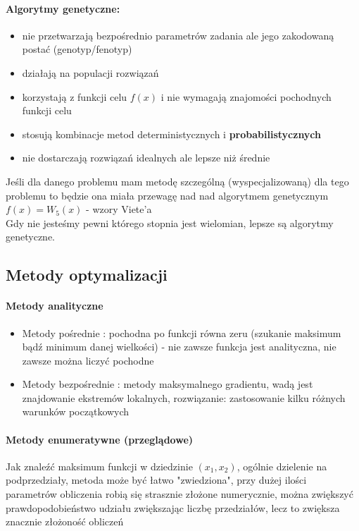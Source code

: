 \documentclass{article}
\begin{document}
		\paragraph{Algorytmy genetyczne:}
		\begin{itemize}
			\item nie przetwarzają bezpośrednio parametrów zadania ale jego zakodowaną postać (genotyp/fenotyp)
			\item działają na populacji rozwiązań
			\item korzystają z funkcji celu $f(x)$ i nie wymagają znajomości pochodnych funkcji celu
			\item stosują kombinacje metod deterministycznych i \textbf{probabilistycznych}
			\item nie dostarczają rozwiązań idealnych ale lepsze niż średnie
			
		\end{itemize}
		Jeśli dla danego problemu mam metodę szczególną (wyspecjalizowaną) dla tego problemu to będzie ona miała przewagę nad nad algorytmem genetycznym\\
		$f(x) = W_5(x)$ - wzory Viete'a\\
		Gdy nie jesteśmy pewni którego stopnia jest wielomian, lepsze są algorytmy genetyczne.
		\subsection{Metody optymalizacji}
			\paragraph{Metody analityczne}
			\begin{itemize}
				\item Metody pośrednie : pochodna po funkcji równa zeru (szukanie maksimum bądź minimum danej wielkości) - nie zawsze funkcja jest analityczna, nie zawsze można liczyć pochodne
				\item Metody bezpośrednie : metody maksymalnego gradientu, wadą jest znajdowanie ekstremów lokalnych, rozwiązanie: zastosowanie kilku różnych warunków początkowych
			\end{itemize}
			\paragraph{Metody enumeratywne (przeglądowe)} Jak znaleźć maksimum funkcji w dziedzinie $(x_1 , x_2)$, ogólnie dzielenie na podprzedziały, metoda może być łatwo "zwiedziona", przy dużej ilości parametrów obliczenia robią się strasznie złożone numerycznie, można zwiększyć prawdopodobieństwo udziału zwiększając liczbę przedziałów, lecz to zwiększa znacznie złożoność obliczeń
\end{document}

